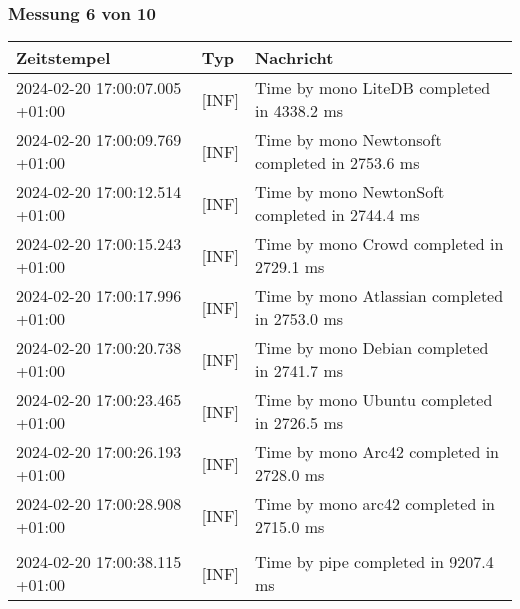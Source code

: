     \subsubsection{Messung 6 von 10} \label{subsubsec:LiteDbWenigerPaketeAlsDb6von10}
        {
            {\small
                \begin{tabularx}{\textwidth}{|l|l|X|}
                    \hline
                    \textbf{Zeitstempel} & \textbf{Typ} & \textbf{Nachricht} \\
                    \hline
                    \endhead
                    2024-02-20 17:00:07.005 +01:00 & [INF] & Time by mono LiteDB completed in 4338.2 ms \\
                    2024-02-20 17:00:09.769 +01:00 & [INF] & Time by mono Newtonsoft completed in 2753.6 ms \\
                    2024-02-20 17:00:12.514 +01:00 & [INF] & Time by mono NewtonSoft completed in 2744.4 ms \\
                    2024-02-20 17:00:15.243 +01:00 & [INF] & Time by mono Crowd completed in 2729.1 ms \\
                    2024-02-20 17:00:17.996 +01:00 & [INF] & Time by mono Atlassian completed in 2753.0 ms \\
                    2024-02-20 17:00:20.738 +01:00 & [INF] & Time by mono Debian completed in 2741.7 ms \\
                    2024-02-20 17:00:23.465 +01:00 & [INF] & Time by mono Ubuntu completed in 2726.5 ms \\
                    2024-02-20 17:00:26.193 +01:00 & [INF] & Time by mono Arc42 completed in 2728.0 ms \\
                    2024-02-20 17:00:28.908 +01:00 & [INF] & Time by mono arc42 completed in 2715.0 ms \\
                    & & \\
                    2024-02-20 17:00:38.115 +01:00 & [INF] & Time by pipe completed in 9207.4 ms \\
                    \hline
                \end{tabularx}
            }
        }

